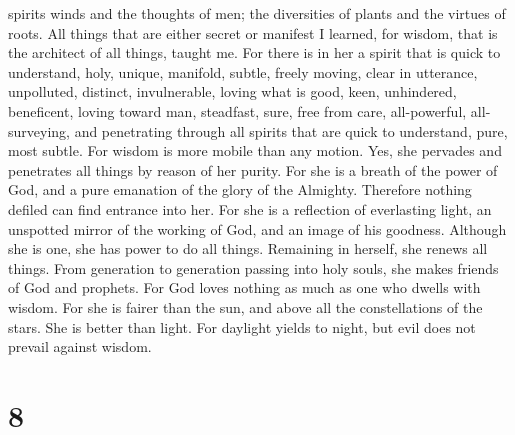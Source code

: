 spirits winds and the thoughts of men; the diversities of plants and the
virtues of roots.  All things that are either secret or
manifest I learned,  for wisdom, that is the architect of
all things, taught me. For there is in her a spirit that is quick to
understand, holy, unique, manifold, subtle, freely moving, clear in
utterance, unpolluted, distinct, invulnerable, loving what is good,
keen, unhindered,  beneficent, loving toward man,
steadfast, sure, free from care, all-powerful, all-surveying, and
penetrating through all spirits that are quick to understand, pure, most
subtle.  For wisdom is more mobile than any motion. Yes,
she pervades and penetrates all things by reason of her purity.
 For she is a breath of the power of God, and a pure
emanation of the glory of the Almighty. Therefore nothing defiled can
find entrance into her.  For she is a reflection of
everlasting light, an unspotted mirror of the working of God, and an
image of his goodness.  Although she is one, she has power
to do all things. Remaining in herself, she renews all things. From
generation to generation passing into holy souls, she makes friends of
God and prophets.  For God loves nothing as much as one who
dwells with wisdom.  For she is fairer than the sun, and
above all the constellations of the stars. She is better than light.
 For daylight yields to night, but evil does not prevail
against wisdom.

\hypertarget{section-6}{%
\section{8}\label{section-6}}

